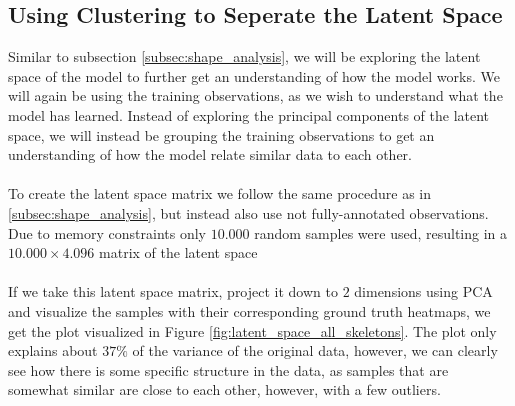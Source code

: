 \documentclass[./main.tex]{subfiles}
\begin{document}
\subsection{Using Clustering to Seperate the Latent Space}
Similar to subsection \ref{subsec:shape_analysis}, we will be exploring the latent space of the model to further get an understanding of how the model works. We will again be using the training observations, as we wish to understand what the model has learned. Instead of exploring the principal components of the latent space, we will instead be grouping the training observations to get an understanding of how the model relate similar data to each other.
\\
\\
To create the latent space matrix we follow the same procedure as in \ref{subsec:shape_analysis}, but instead also use not fully-annotated observations. Due to memory constraints only $10.000$ random samples were used, resulting in a $10.000 \times 4.096$ matrix of the latent space
\\
\\
If we take this latent space matrix, project it down to $2$ dimensions using PCA and visualize the samples with their corresponding ground truth heatmaps, we get the plot visualized in Figure \ref{fig:latent_space_all_skeletons}. The plot only explains about $37\%$ of the variance of the original data, however, we can clearly see how there is some specific structure in the data, as samples that are somewhat similar are close to each other, however, with a few outliers.
\\
\end{document}
